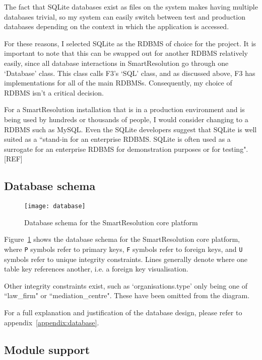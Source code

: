 The fact that SQLite databases exist as files on the system makes having multiple databases trivial, so my system can easily switch between test and production databases depending on the context in which the application is accessed.

For these reasons, I selected SQLite as the RDBMS of choice for the project. It is important to note that this can be swapped out for another RDBMS relatively easily, since all database interactions in SmartResolution go through one `Database' class. This class calls F3's `SQL' class, and as discussed above, F3 has implementations for all of the main RDBMSs. Consequently, my choice of RDBMS isn't a critical decision.

For a SmartResolution installation that is in a production environment and is being used by hundreds or thousands of people, I would consider changing to a RDBMS such as MySQL. Even the SQLite developers suggest that SQLite is well suited as a ``stand-in for an enterprise RDBMS. SQLite is often used as a surrogate for an enterprise RDBMS for demonstration purposes or for testing". [REF] %

\subsection{Database schema}

\begin{figure}[h!]
  \centering
    \ifimages
    \texttt{[image: database]}
    \fi
  \caption{Database schema for the SmartResolution core platform}
  \label{uml:databaseSchema}
\end{figure}

Figure~\ref{uml:databaseSchema} shows the database schema for the SmartResolution core platform, where \lstinline{P} symbols refer to primary keys, \lstinline{F} symbols refer to foreign keys, and \lstinline{U} symbols refer to unique integrity constraints. Lines generally denote where one table key references another, i.e. a foreign key visualisation.

Other integrity constraints exist, such as `organisations.type' only being one of ``law\_firm" or ``mediation\_centre". These have been omitted from the diagram.

For a full explanation and justification of the database design, please refer to appendix~\ref{appendix:database}.

\subsection{Module support}

